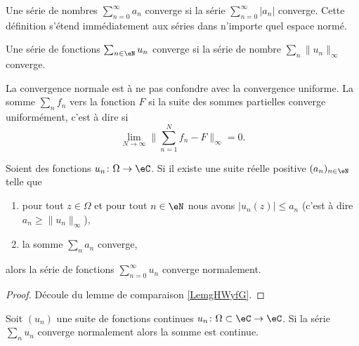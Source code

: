 \begin{definition}  \label{DefQDrDqek}
    Une série de nombres \( \sum_{n=0}^{\infty}a_n\) converge  si la série $\sum_{n=0}^{\infty}| a_n |$ converge. Cette définition s'étend immédiatement aux séries dans n'importe quel espace normé.

    Une série de fonctions \( \sum_{n\in \eN}u_n \) converge  si la série de nombre \( \sum_n\| u_n \|_{\infty}\) converge.
\end{definition}

La convergence normale est à ne pas confondre avec la convergence uniforme. La somme \( \sum_nf_n\)  vers la fonction \( F\) si la suite des sommes partielles converge uniformément, c'est à dire si 
\begin{equation}
    \lim_{N\to \infty} \| \sum_{n=1}^Nf_n-F \|_{\infty}=0.
\end{equation}

\begin{lemma}
    Soient des fonctions \( u_n\colon \Omega\to \eC\). Si il existe une suite réelle positive \( (a_n)_{n\in \eN}\) telle que
    \begin{enumerate}
        \item
            pour tout \( z\in \Omega\) et pour tout \( n\in \eN\) nous avons \( | u_n(z) |\leq a_n\) (c'est à dire \( a_n\geq \| u_n \|_{\infty}\)),
        \item
            la somme \( \sum_{n}a_n\) converge,
    \end{enumerate}
    alors la série de fonctions \( \sum_{n=0}^{\infty}u_n\) converge normalement.
\end{lemma}

\begin{proof}
    Découle du lemme de comparaison \ref{LemgHWyfG}.
\end{proof}

\begin{proposition}     \label{PropUEMoNF}
    Soit \( (u_n)\) une suite de fonctions continues \( u_n\colon \Omega\subset\eC\to \eC\). Si la série \( \sum_nu_n\) converge normalement alors la somme est continue.
\end{proposition}

